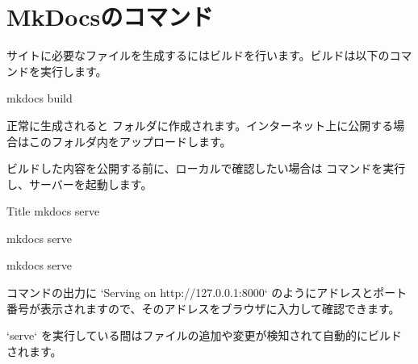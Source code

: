 \documentclass[../main]{subfiles}
\begin{document}
\setcounter{section}{3}
\section{MkDocsのコマンド}

サイトに必要なファイルを生成するにはビルドを行います。ビルドは以下のコマンドを実行します。

\begin{Pre}{}
mkdocs build
\end{Pre}

正常に生成されると  フォルダに作成されます。インターネット上に公開する場合はこのフォルダ内をアップロードします。

ビルドした内容を公開する前に、ローカルで確認したい場合は    コマンドを実行し、サーバーを起動します。


\begin{Admonition}[type=error]{Title}
    mkdocs serve
\end{Admonition}

\begin{RoundBox}
    mkdocs serve
\end{RoundBox}

\begin{Pre}{}
mkdocs serve
\end{Pre}

コマンドの出力に `Serving on http://127.0.0.1:8000` のようにアドレスとポート番号が表示されますので、そのアドレスをブラウザに入力して確認できます。

`serve` を実行している間はファイルの追加や変更が検知されて自動的にビルドされます。
\end{document}
